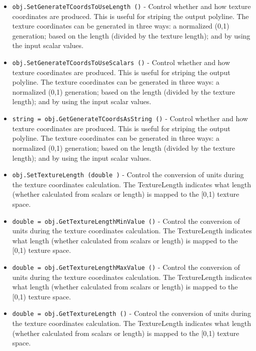 \begin{itemize}
\item  \verb|obj.SetGenerateTCoordsToUseLength ()| -  Control whether and how texture coordinates are produced. This is
 useful for striping the output polyline. The texture coordinates
 can be generated in three ways: a normalized (0,1) generation;
 based on the length (divided by the texture length); and by using
 the input scalar values.

\item  \verb|obj.SetGenerateTCoordsToUseScalars ()| -  Control whether and how texture coordinates are produced. This is
 useful for striping the output polyline. The texture coordinates
 can be generated in three ways: a normalized (0,1) generation;
 based on the length (divided by the texture length); and by using
 the input scalar values.

\item  \verb|string = obj.GetGenerateTCoordsAsString ()| -  Control whether and how texture coordinates are produced. This is
 useful for striping the output polyline. The texture coordinates
 can be generated in three ways: a normalized (0,1) generation;
 based on the length (divided by the texture length); and by using
 the input scalar values.

\item  \verb|obj.SetTextureLength (double )| -  Control the conversion of units during the texture coordinates
 calculation. The TextureLength indicates what length (whether 
 calculated from scalars or length) is mapped to the [0,1)
 texture space.

\item  \verb|double = obj.GetTextureLengthMinValue ()| -  Control the conversion of units during the texture coordinates
 calculation. The TextureLength indicates what length (whether 
 calculated from scalars or length) is mapped to the [0,1)
 texture space.

\item  \verb|double = obj.GetTextureLengthMaxValue ()| -  Control the conversion of units during the texture coordinates
 calculation. The TextureLength indicates what length (whether 
 calculated from scalars or length) is mapped to the [0,1)
 texture space.

\item  \verb|double = obj.GetTextureLength ()| -  Control the conversion of units during the texture coordinates
 calculation. The TextureLength indicates what length (whether 
 calculated from scalars or length) is mapped to the [0,1)
 texture space.

\end{itemize}
